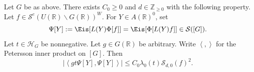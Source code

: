 \begin{lemma}\label{lem:standard2:matrix-coeff-bounds}
  Let $G$ be as above.  There exists $C_0 \geq 0$ and $d \in \mathbb{Z}_{\geq 0}$ with the following property.  Let $f \in \mathcal{S}^e(U(\mathbb{R}) \backslash G(\mathbb{R}))^W$.  For $Y \in A(\mathbb{R})^0$, set
  \begin{equation*}
    \Psi[Y] := \Eis[L(Y) \Phi[f]]  = \Eis[\Phi[L(Y) f]] \in \mathcal{S}([G]).
  \end{equation*}
  Let $t \in \mathcal{H}_G$ be nonnegative.  Let $g \in G(\mathbb{R})$ be arbitrary.  Write $\left\langle , \right\rangle$ for the Petersson inner product on $[G]$.  Then
  \begin{equation}\label{eq:leftlangle-g-t}
    |\left\langle g t \Psi[Y], \Psi[Y]  \right\rangle| \leq C_0 \lambda_0(t) \mathcal{S}_{d,0}(f)^2.
  \end{equation}
\end{lemma}
